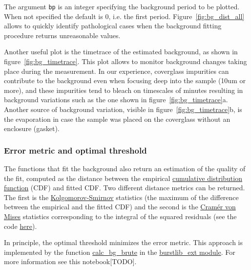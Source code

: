 The argument \verb|bp| is an integer specifying the background period to be plotted.
When not specified the default is 0, i.e. the first period.
Figure~\ref{fig:bg_dist_all} allows to quickly identify pathological cases when the 
background fitting procedure returns unreasonable values. 

Another useful plot is the timetrace of the estimated background, as shown in 
figure~\ref{fig:bg_timetrace}. This plot allows to monitor background changes
taking place during the measurement. In our experience, coverglass impurities
can contribute to the background even when focusing deep into the sample (10um or more),
and these impurities tend to bleach on timescales of minutes resulting in
background variations such as the one shown in figure~\ref{fig:bg_timetrace}a.
Another source of background variation, visible in figure~\ref{fig:bg_timetrace}b, is 
the evaporation in case the sample was placed on the coverglass without an enclosure (gasket).

\subsubsection{Error metric and optimal threshold}

The functions that fit the background also return an estimation of the
quality of the fit, computed as the distance between the empirical
\href{http://en.wikipedia.org/wiki/Cumulative\_distribution\_function}{cumulative distribution function}
(CDF) and fitted CDF. Two different distance metrics can be returned.
The first is the
\href{http://en.wikipedia.org/wiki/Kolmogorov\%E2\%80\%93Smirnov\_test}{Kolgomorov-Smirnov}
statistics (the maximum of the difference between the empirical and the
fitted CDF) and the second is the
\href{http://en.wikipedia.org/wiki/Cram\%C3\%A9r\%E2\%80\%93von\_Mises\_criterion}{Cramér von Mises}
statistics corresponding to the integral of the squared residuals
(see the code
\href{https://github.com/tritemio/FRETBursts/blob/master/fretbursts/background.py#L41}{here}).

In principle, the optimal threshold minimizes
the error metric. This approach is implemented by the function
\href{http://fretbursts.readthedocs.org/en/latest/plugins.html#fretbursts.burstlib\_ext.calc\_bg\_brute}{calc\_bg\_brute}
in the
\href{http://fretbursts.readthedocs.org/en/latest/plugins.html}{burstlib\_ext module}.
For more information see this notebook[TODO].
